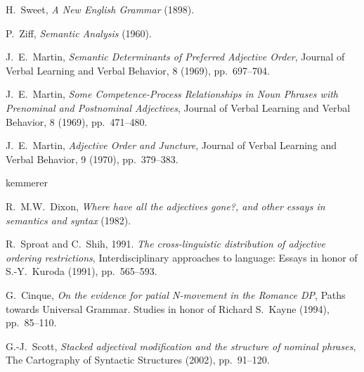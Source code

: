 \documentclass[12pt]{article}
\begin{document}
\begin{thebibliography}{10}

	H.~Sweet, {\em A New English Grammar} (1898).

	P.~Ziff, {\em Semantic Analysis} (1960).

	J.~E.~Martin, {\em Semantic Determinants of Preferred Adjective Order}, Journal of Verbal Learning and Verbal Behavior, 8 (1969), pp.~697--704. 

	J.~E.~Martin, {\em Some Competence-Process Relationships in Noun Phrases with Prenominal and Postnominal Adjectives}, Journal of Verbal Learning and Verbal Behavior, 8 (1969), pp.~471--480. 

	J.~E.~Martin, {\em Adjective Order and Juncture}, Journal of Verbal Learning and Verbal Behavior, 9 (1970), pp.~379--383. 

	kemmerer

	R.~M.W.~Dixon, {\em Where have all the adjectives gone?, and other essays in semantics and syntax} (1982).

	R.~Sproat and C.~Shih, 1991. {\em The cross-linguistic distribution of adjective ordering restrictions}, Interdisciplinary approaches to language: Essays in honor of S.-Y.~Kuroda (1991), pp.~565--593.

	G.~Cinque, {\em On the evidence for patial N-movement in the Romance DP}, Paths towards Universal Grammar. Studies in honor of Richard S.~Kayne (1994), pp.~85--110.

	G.-J.~Scott, {\em Stacked adjectival modification and the structure of nominal phrases}, The Cartography of Syntactic Structures (2002), pp.~91--120.
\end{thebibliography}


%
%
\end{document}
